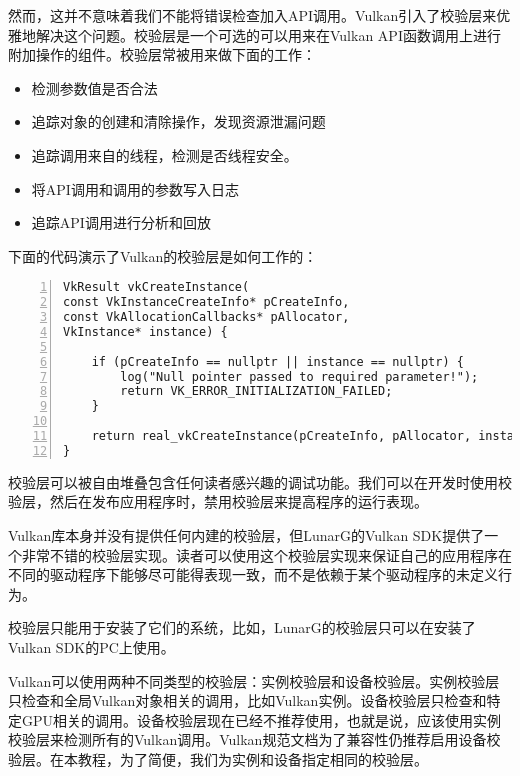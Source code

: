 \documentclass{ctexart}
\begin{document}
然而，这并不意味着我们不能将错误检查加入API调用。Vulkan引入了校验层来优雅地解决这个问题。校验层是一个可选的可以用来在Vulkan API函数调用上进行附加操作的组件。校验层常被用来做下面的工作：

\begin{itemize}
	\item 检测参数值是否合法
	\item 追踪对象的创建和清除操作，发现资源泄漏问题
	\item 追踪调用来自的线程，检测是否线程安全。
	\item 将API调用和调用的参数写入日志
	\item 追踪API调用进行分析和回放
\end{itemize}

下面的代码演示了Vulkan的校验层是如何工作的：

\begin{lstlisting}[language={[ANSI]C},keywordstyle=\color{blue!70},commentstyle=\color{red!50!green!50!blue!50},frame=shadowbox, rulesepcolor=\color{red!20!green!20!blue!20},basicstyle=\small,numbers=left, numberstyle=\tiny,breaklines=true]
VkResult vkCreateInstance(
const VkInstanceCreateInfo* pCreateInfo,
const VkAllocationCallbacks* pAllocator,
VkInstance* instance) {

	if (pCreateInfo == nullptr || instance == nullptr) {
		log("Null pointer passed to required parameter!");
		return VK_ERROR_INITIALIZATION_FAILED;
	}

	return real_vkCreateInstance(pCreateInfo, pAllocator, instance);
}
\end{lstlisting}

校验层可以被自由堆叠包含任何读者感兴趣的调试功能。我们可以在开发时使用校验层，然后在发布应用程序时，禁用校验层来提高程序的运行表现。

Vulkan库本身并没有提供任何内建的校验层，但LunarG的Vulkan SDK提供了一个非常不错的校验层实现。读者可以使用这个校验层实现来保证自己的应用程序在不同的驱动程序下能够尽可能得表现一致，而不是依赖于某个驱动程序的未定义行为。

校验层只能用于安装了它们的系统，比如，LunarG的校验层只可以在安装了Vulkan SDK的PC上使用。

Vulkan可以使用两种不同类型的校验层：实例校验层和设备校验层。实例校验层只检查和全局Vulkan对象相关的调用，比如Vulkan实例。设备校验层只检查和特定GPU相关的调用。设备校验层现在已经不推荐使用，也就是说，应该使用实例校验层来检测所有的Vulkan调用。Vulkan规范文档为了兼容性仍推荐启用设备校验层。在本教程，为了简便，我们为实例和设备指定相同的校验层。
\end{document}
